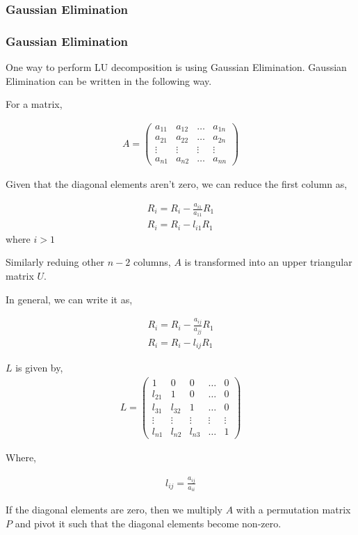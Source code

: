 \documentclass{beamer}
\theoremstyle{remark}
\newcommand{\myvec}[1]{\ensuremath{\begin{pmatrix}#1\end{pmatrix}}}
\numberwithin{equation}{section}
\begin{document}
\subsubsection{Gaussian Elimination}
\begin{frame}[allowframebreaks]
    \frametitle{Gaussian Elimination}
    One way to perform LU decomposition is using Gaussian Elimination.
    Gaussian Elimination can be written in the following way.

    For a matrix,

    \begin{align}
        A = \myvec{a_{11} & a_{12} & \dots & a_{1n}\\a_{21} & a_{22} & \dots & a_{2n}\\\vdots & \vdots & \vdots & \vdots\\a_{n1} & a_{n2} & \dots & a_{nn}}
    \end{align}

    Given that the diagonal elements aren't zero, we can reduce the first column as,

    \begin{align}
        R_i = R_i - \frac{a_{i1}}{a_{11}}R_1\\
        R_i = R_i - l_{i1}R_1
    \end{align}
    where $i>1$

    Similarly reduing other $n-2$ columns, $A$ is transformed into an upper triangular matrix $U$.

    In general, we can write it as,

    \begin{align}
        R_i = R_i - \frac{a_{ij}}{a_{jj}}R_1\\
        R_i = R_i - l_{ij}R_1
    \end{align}

    $L$ is given by,
    \begin{align}
        L = \myvec{1 & 0 & 0 & \dots & 0\\l_{21} & 1 & 0 & \dots & 0\\ l_{31} & l_{32} & 1 & \dots & 0\\
        \vdots & \vdots & \vdots & \vdots & \vdots\\l_{n1} & l_{n2} & l_{n3} & \dots & 1}
    \end{align}

    Where,

    \begin{align}
        l_{ij} = \frac{a_{ij}}{a_{ii}}
    \end{align}

    If the diagonal elements are zero, then we multiply $A$ with a permutation matrix
 $P$ and pivot it such that the diagonal elements become non-zero. 
\end{frame}
\end{document}
